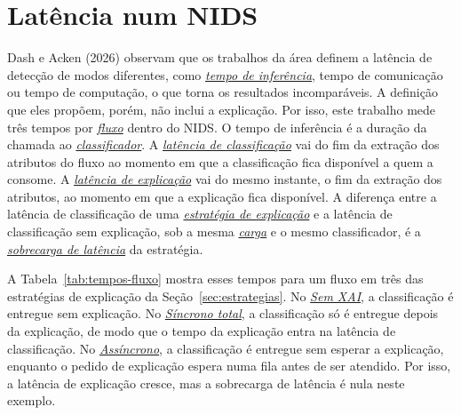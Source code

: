 \documentclass[
  12pt,
  oneside,
  a4paper,
  chapter=TITLE,
  sumario=tradicional,
  english,
  brazil
]{abntex2}
\newcommand{\termo}[2]{\hyperref[gl:#1]{\emph{#2}}}
\begin{document}
\section{Latência num NIDS}
\label{sec:latencia-nids}

Dash e Acken (2026) observam que os trabalhos da área definem a latência de detecção de modos
diferentes, como \termo{tempo-inferencia}{tempo de inferência}, tempo de comunicação ou tempo de
computação, o que torna os resultados incomparáveis. A definição que eles propõem, porém, não inclui
a explicação. Por isso, este trabalho mede três tempos por \termo{fluxo}{fluxo} dentro do NIDS. O
tempo de inferência é a duração da chamada ao \termo{classificador}{classificador}. A
\termo{latencia-classificacao}{latência de classificação} vai do fim da extração dos atributos do
fluxo ao momento em que a classificação fica disponível a quem a consome. A
\termo{latencia-explicacao}{latência de explicação} vai do mesmo instante, o fim da extração dos
atributos, ao momento em que a explicação fica disponível. A diferença entre a latência de
classificação de uma \termo{estrategia}{estratégia de explicação} e a latência de classificação sem
explicação, sob a mesma \termo{carga}{carga} e o mesmo classificador, é a
\termo{sobrecarga}{sobrecarga de latência} da estratégia.

A Tabela~\ref{tab:tempos-fluxo} mostra esses tempos para um fluxo em três das estratégias de
explicação da Seção~\ref{sec:estrategias}. No \termo{sem-xai}{Sem XAI}, a classificação é entregue
sem explicação. No \termo{sincrono-total}{Síncrono total}, a classificação só é entregue depois da
explicação, de modo que o tempo da explicação entra na latência de classificação. No
\termo{assincrono}{Assíncrono}, a classificação é entregue sem esperar a explicação, enquanto o
pedido de explicação espera numa fila antes de ser atendido. Por isso, a latência de explicação cresce, mas a
sobrecarga de latência é nula neste exemplo.
\end{document}
